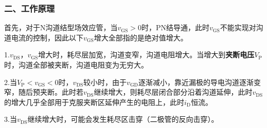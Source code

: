 \subsubsection{二、工作原理}
首先，对于N沟道结型场效应管，当$v_{\mathrm{GS}}>0$时，PN结导通，此时$v_{\mathrm{GS}}$不能实现对沟道电流的控制，因此以下$v_{\mathrm{GS}}$增大全部指的是绝对值增大。

1.$v_{\mathrm{DS}}$，$v_{\mathrm{GS}}$增大时，耗尽层加宽，沟道变窄，沟道电阻增大。当增大到\textbf{夹断电压}$V_\mathrm{P}$时，沟道全部被夹断，沟道电阻变为无穷大。

2.当$V_\mathrm{P}<v_{\mathrm{GS}}<0$时，$v_{\mathrm{DS}}$较小时，由于$v_{\mathrm{GD}}$逐渐减小，靠近漏极的导电沟道逐渐变窄，随后预夹断。此时若$v_{\mathrm{DS}}$继续增大，则耗尽层闭合部分沿着沟道延伸，此时$v_{\mathrm{DS}}$的增大几乎全部用于克服夹断区延伸产生的电阻上，此时$i_\mathrm{D}$恒流。

3.当$v_{\mathrm{DS}}$继续增大时，可能会发生耗尽区击穿（二极管的反向击穿）。